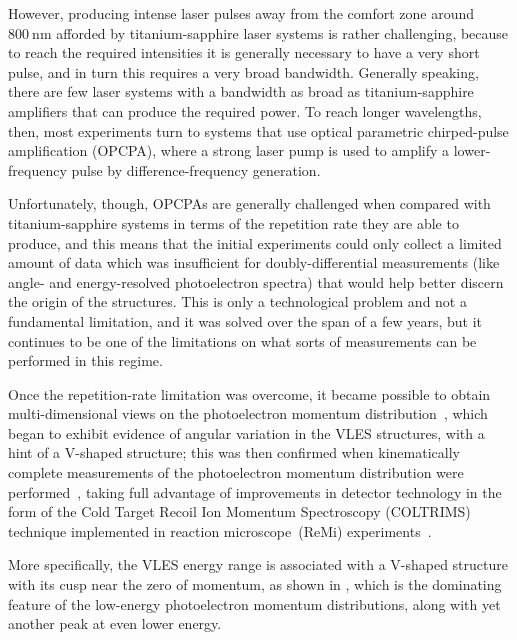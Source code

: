 However, producing intense laser pulses away from the comfort zone around $\SI{800}{\nano\meter}$ afforded by titanium-sapphire laser systems is rather challenging, because to reach the required intensities it is generally necessary to have a very short pulse, and in turn this requires a very broad bandwidth. Generally speaking, there are few laser systems with a bandwidth as broad as titanium-sapphire amplifiers that can produce the required power. To reach longer wavelengths, then, most experiments turn to systems that use optical parametric chirped-pulse amplification (OPCPA), where a strong laser pump is used to amplify a lower-frequency pulse by difference-frequency generation. 

Unfortunately, though, OPCPAs are generally challenged when compared with ti\-ta\-nium-sapphire systems in terms of the repetition rate they are able to produce, and this means that the initial experiments could only collect a limited amount of data which was insufficient for doubly-differential measurements (like angle- and energy-resolved photoelectron spectra) that would help better discern the origin of the structures. This is only a technological problem and not a fundamental limitation, and it was solved over the span of a few years, but it continues to be one of the limitations on what sorts of measurements can be performed in this regime.



Once the repetition-rate limitation was overcome, it became possible to obtain multi-dimensional views on the photoelectron momentum distribution~\cite{ dura_ionization_2013}, which began to exhibit evidence of angular variation in the VLES structures, with a hint of a V-shaped structure; this was then confirmed when kinematically complete measurements of the photoelectron momentum distribution were performed~\cite{pullen_kinematically_2014}, taking full advantage of improvements in detector technology in the form of the Cold Target Recoil Ion Momentum Spectroscopy (COLTRIMS) technique implemented in reaction microscope~(ReMi) experiments~\cite{moshammer_ReMi_2003,reaction_microscope}.



More specifically, the VLES energy range is associated with a V-shaped structure with its cusp near the zero of momentum, as shown in , which is the dominating feature of the low-energy photoelectron momentum distributions, along with yet another peak at even lower energy. 

